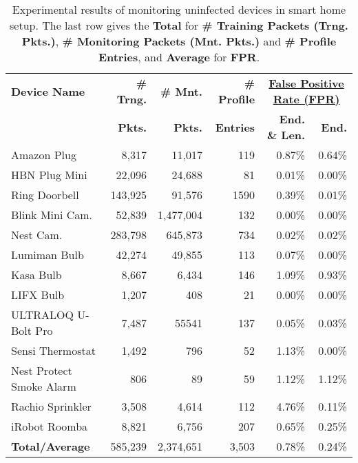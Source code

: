 \begin{table}[t!]
	\scriptsize
	\centering
        \caption{Experimental results of monitoring uninfected devices in smart home setup. The last row gives the \textbf{Total} for \textbf{\# Training Packets (Trng. Pkts.)}, \textbf{\# Monitoring Packets (Mnt. Pkts.)} and \textbf{\# Profile Entries}, and \textbf{Average} for \textbf{FPR}.}
	\begin{tabularx}{\linewidth}
{p{15mm} r r r r r}
  \toprule
  \textbf{Device Name} & \textbf{\# Trng.} &\textbf{\# Mnt.} & \textbf{\# Profile} & \multicolumn{2}{c}{\textbf{\underline{False Positive Rate (FPR)}}} \\
  & \textbf{Pkts.} & \textbf{Pkts.} & \textbf{Entries} & \textbf{End. \& Len.} & \textbf{End.}\\
  \midrule
  Amazon Plug & 8,317 & 11,017 & 119 & 0.87\% & 0.64\% \\ 
  HBN Plug Mini & 22,096 & 24,688 & 81 & 0.01\% & 0.00\% \\ 
  Ring Doorbell & 143,925 & 91,576 & 1590 & 0.39\% & 0.01\% \\ 
  Blink Mini Cam. & 52,839 & 1,477,004 & 132 & 0.00\% & 0.00\% \\ 
  Nest Cam. & 283,798 & 645,873 & 734 & 0.02\% & 0.02\% \\ 
  Lumiman Bulb & 42,274 & 49,855 & 113 & 0.07\% & 0.00\% \\ 
  Kasa Bulb & 8,667 & 6,434 & 146 & 1.09\% & 0.93\% \\ 
  LIFX Bulb & 1,207 & 408 & 21 & 0.00\% & 0.00\% \\ 
  ULTRALOQ U-Bolt Pro & 7,487 & 55541 & 137 & 0.05\% & 0.03\% \\ 
  Sensi Thermostat & 1,492 & 796 & 52 & 1.13\% & 0.00\% \\ 
  Nest Protect Smoke Alarm & 806 & 89 & 59 & 1.12\% & 1.12\% \\ 
  Rachio Sprinkler & 3,508 & 4,614 & 112 & 4.76\% & 0.11\% \\ 
  iRobot Roomba & 8,821 & 6,756 & 207 & 0.65\% & 0.25\% \\
  \midrule
  \textbf{Total/Average} & 585,239 & 2,374,651 & 3,503 & 0.78\% & 0.24\% \\
  \bottomrule
\end{tabularx}
\vspace{-1em}
\label{tab:device false positive}
\end{table}

